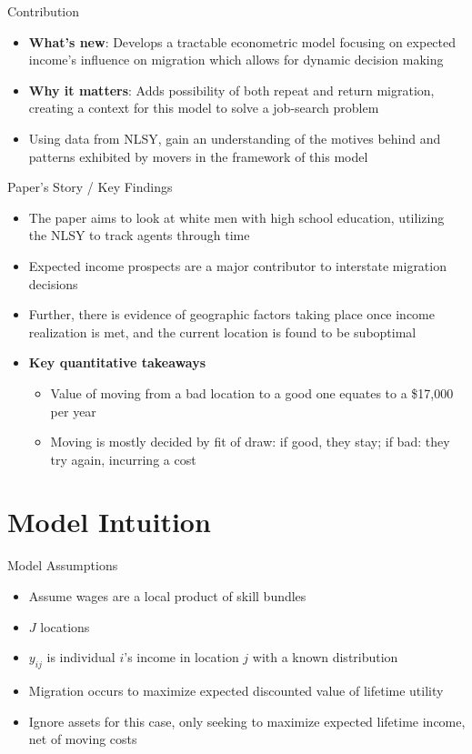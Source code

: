 \documentclass[aspectratio=169,professionalfonts]{beamer}
\newcommand{\hl}[1]{\textbf{\textcolor{UGARed}{#1}}}
\newcommand{\hl}[1]{\textbf{\color{UGARed}{#1}}}
\begin{document}
\begin{frame}{Contribution}
  \begin{itemize}
    \item \hl{What’s new}: Develops a tractable econometric model focusing on expected income's influence on migration which allows for dynamic decision making
    \item \hl{Why it matters}: Adds possibility of both repeat and return migration, creating a context for this model to solve a job-search problem
    \item Using data from NLSY, gain an understanding of the motives behind and patterns exhibited by movers in the framework of this model
  \end{itemize}
\end{frame}

\begin{frame}{Paper’s Story / Key Findings}
  \begin{itemize}
    \item The paper aims to look at white men with high school education, utilizing the NLSY to track agents through time
    \item Expected income prospects are a major contributor to interstate migration decisions
    \item Further, there is evidence of geographic factors taking place once income realization is met, and the current location is found to be suboptimal
    \item \hl{Key quantitative takeaways}
    \begin{itemize}
      \item Value of moving from a bad location to a good one equates to a \$17,000 per year
      \item Moving is mostly decided by fit of draw: if good, they stay; if bad: they try again, incurring a cost
    \end{itemize}
  \end{itemize}
\end{frame}

\section{Model Intuition}

\begin{frame}{Model Assumptions}
  \begin{itemize}
    \item Assume wages are a local product of skill bundles
    \item $J$ locations
    \item $y_{ij}$ is individual $i$'s income in location $j$ with a known distribution
    \item Migration occurs to maximize expected discounted value of lifetime utility
    \item Ignore assets for this case, only seeking to maximize expected lifetime income, net of moving costs
  \end{itemize}
\end{frame}
\end{document}

